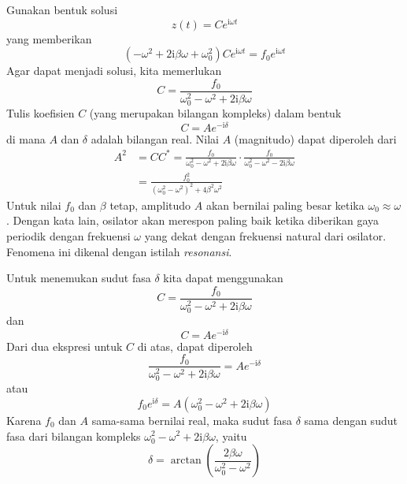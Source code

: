 Gunakan bentuk solusi
\begin{equation*}
z(t) = Ce^{\mathrm{i}\omega t}
\end{equation*}
yang memberikan
\begin{equation*}
(-\omega^{2}+2\mathrm{i}\beta\omega+\omega_{0}^{2})Ce^{\mathrm{i}\omega t}=f_{0}e^{\mathrm{i}\omega t}
\end{equation*}
Agar dapat menjadi solusi, kita memerlukan
\begin{equation*}
C = \frac{f_{0}}{\omega_{0}^{2} - \omega^{2} + 2\mathrm{i}\beta\omega}
\end{equation*}
Tulis koefisien $C$ (yang merupakan bilangan kompleks) dalam bentuk
\begin{equation*}
C = Ae^{-\mathrm{i}\delta}
\end{equation*}
di mana $A$ dan $\delta$ adalah bilangan real.
Nilai $A$ (magnitudo) dapat diperoleh dari
\begin{align*}
A^{2} & = CC^{*} =
\frac{f_{0}}{\omega_{0}^{2} - \omega^{2} + 2\mathrm{i}\beta\omega} \cdot 
\frac{f_{0}}{\omega_{0}^{2} - \omega^{2} - 2\mathrm{i}\beta\omega} \\
 & = \frac{f_{0}^{2}}{\left(\omega_{0}^{2} - \omega^{2}\right)^{2} + 4\beta^{2}\omega^{2}}
\end{align*}
Untuk nilai $f_0$ dan $\beta$ tetap, amplitudo $A$ akan
bernilai paling besar ketika $\omega_{0} \approx \omega$.
Dengan kata lain, osilator
akan merespon paling baik ketika diberikan gaya periodik dengan
frekuensi $\omega$ yang dekat dengan frekuensi natural dari osilator.
Fenomena ini dikenal dengan istilah \emph{resonansi}.

Untuk menemukan sudut fasa $\delta$ kita dapat menggunakan
\begin{equation*}
C = \frac{f_{0}}{\omega_{0}^{2}-\omega^{2}+2\mathrm{i}\beta\omega}
\end{equation*}
dan
\begin{equation*}
C = Ae^{-\mathrm{i}\delta}
\end{equation*}
Dari dua ekspresi untuk $C$ di atas, dapat diperoleh
\begin{equation*}
\frac{f_{0}}{\omega_{0}^{2} - \omega^{2} + 2\mathrm{i}\beta\omega} = A e^{-\mathrm{i}\delta}
\end{equation*}
atau
\begin{equation*}
f_{0}e^{\mathrm{i}\delta} = A\left(\omega_{0}^{2} - \omega^{2} + 2\mathrm{i}\beta\omega\right)
\end{equation*}
Karena $f_{0}$ dan $A$ sama-sama bernilai real, maka sudut fasa
$\delta$ sama dengan sudut fasa dari bilangan kompleks $\omega_{0}^{2}-\omega^{2} + 2\mathrm{i}\beta\omega$,
yaitu
\begin{equation*}
\delta = \arctan\left(\frac{2\beta\omega}{\omega_{0}^{2}-\omega^{2}}\right)
\end{equation*}

